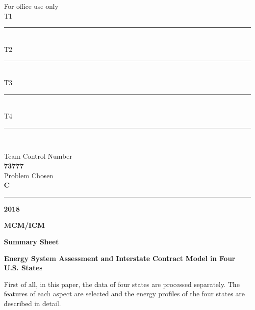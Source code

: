 \documentclass[a4paper]{article}
\begin{document}
\thispagestyle{empty}
\begin{minipage}{0.3\textwidth}
\begin{flushleft}
For office use only\\
   T1\ \rule{3cm}{0.5pt}\\
   T2\ \rule{3cm}{0.5pt}\\
   T3\ \rule{3cm}{0.5pt}\\
   T4\ \rule{3cm}{0.5pt}\\
\end{flushleft}
\end{minipage}\hspace{\fill}
\begin{minipage}{0.3\textwidth}
\centering
Team Control Number\\[5pt]
\fontsize{36pt}{\baselineskip}\selectfont  \textbf{73777} \normalsize\\[10pt]
Problem Chosen\\[5pt]
\fontsize{18pt}{\baselineskip}\selectfont \textbf{C}\normalsize\\
\end{minipage}\hfill
\begin{minipage}{0.35\textwidth}
\begin{flushright}
\end{flushright}
\end{minipage}\vspace*{10pt}
\rule{\textwidth}{0.5pt}

\begin{center}
  \textbf{2018}
\end{center}
\begin{center}
  \textbf{MCM/ICM}
\end{center}
\begin{center}
  \textbf{Summary Sheet}
\end{center}

{\begin{center}\Large \textbf{Energy System Assessment and Interstate Contract Model in Four U.S. States}\end{center}}

First of all, in this paper, the data of four states are processed separately. The features of each aspect are selected and the energy profiles of the four states are described in detail.
\end{document}
